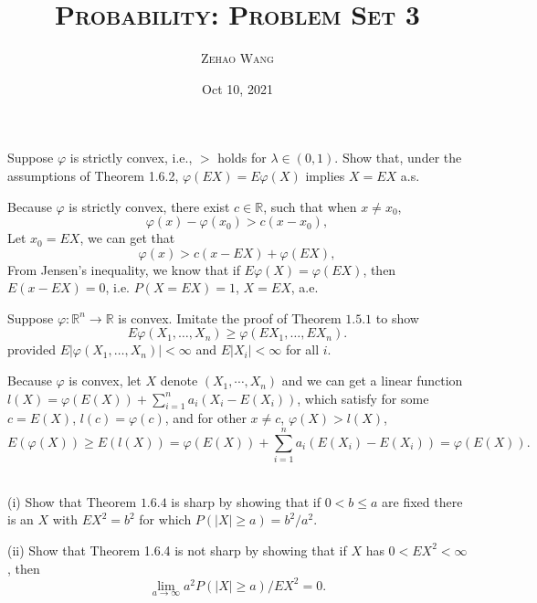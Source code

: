 \documentclass[en, normal, 11pt, black]{elegantnote}
\title{\textsc{Probability: Problem Set 3}}
\author{\textsc{Zehao Wang}}
\date{Oct 10, 2021}
\newenvironment{exercise}[1]{\begin{tcolorbox}[colback=black!15, colframe=black!80, breakable, title=#1]}{\end{tcolorbox}}
\renewenvironment{proof}{\begin{tcolorbox}[colback=white, colframe=black!50, breakable, title=Proof. ]\setlength{\parskip}{0.8em}}{\,\\\rightline{$\square$}\end{tcolorbox}}
\begin{document}
    \maketitle
    \begin{exercise}{1.6.1}
        Suppose $\varphi$ is strictly convex, i.e., $>$ holds for $\lambda \in(0,1)$. Show that, under the assumptions of Theorem 1.6.2, $\varphi(E X)=E \varphi(X)$ implies $X=E X$ a.s. 
    \end{exercise} 

    \begin{proof}
        Because $\varphi$ is strictly convex, there exist $c\in \mathbb{R}$, such that when $x\not=x_0$, 
        \[
            \varphi(x)-\varphi(x_0)>c(x-x_0), 
        \]
        Let $x_0=EX$, we can get that 
        \[
            \varphi(x)>c(x-EX)+\varphi(EX), 
        \]
        From Jensen's inequality, we know that if $E\varphi(X)=\varphi(EX)$, then $E(x-EX)=0$, i.e. $P(X=EX)=1$, $X=EX$, a.e. 
    \end{proof}


    \begin{exercise}{1.6.2}
        Suppose $\varphi: \mathbb{R}^{n} \rightarrow \mathbb{R}$ is convex. Imitate the proof of Theorem $1.5.1$ to show
        \[
            E \varphi\left(X_{1}, \ldots, X_{n}\right) \geq \varphi\left(E X_{1}, \ldots, E X_{n}\right). 
        \]
        provided $E\left|\varphi\left(X_{1}, \ldots, X_{n}\right)\right|<\infty$ and $E\left|X_{i}\right|<\infty$ for all $i$. 
    \end{exercise}

    \begin{proof}
        Because $\varphi$ is convex, let $X$ denote $(X_1, \cdots, X_n)$ and we can get a linear function $l(X)=\varphi(E(X))+\sum_{i=1}^na_i(X_i-E(X_i))$, which satisfy for some $c=E(X)$, $l(c)=\varphi(c)$, and for other $x\not=c$, $\varphi(X)>l(X)$, 
        \[
            E(\varphi(X))\geqslant E\left(l(X)\right)=\varphi(E(X))+\sum_{i=1}^na_i(E(X_i)-E(X_i))=\varphi(E(X)). 
        \]
        \vspace{-30pt}
    \end{proof}


    \begin{exercise}{1.6.3. Chebyshev's inequality is and is not sharp.}        
        (i) Show that Theorem $1.6.4$ is sharp by showing that if $0<b \leq a$ are fixed there is an $X$ with $E X^{2}=b^{2}$ for which $P(|X| \geq a)=b^{2} / a^{2}$. 
        
        (ii) Show that Theorem 1.6.4 is not sharp by showing that if $X$ has $0<E X^{2}<\infty$, then
        \[
            \lim _{a \rightarrow \infty} a^{2} P(|X| \geq a) / E X^{2}=0. 
        \]
    \end{exercise}
\end{document}
